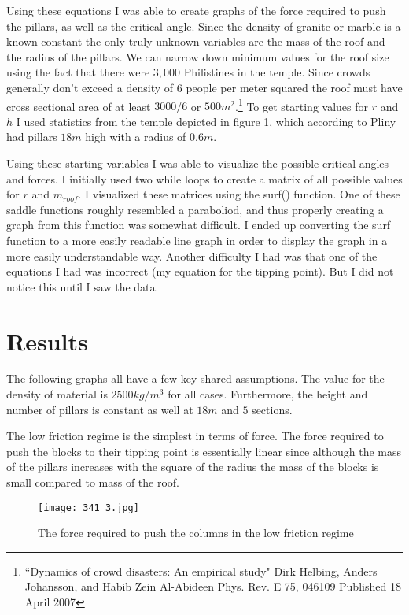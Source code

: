 \documentclass[two column]{article}
\begin{document}
Using these equations I was able to create graphs of the force required to push the pillars, as well as the critical angle. Since the density of granite or marble is a known constant the only truly unknown variables are the mass of the roof and the radius of the pillars. We can narrow down minimum values for the roof size using the fact that there were $3,000$ Philistines in the temple. Since crowds generally don't exceed a density of $6$ people per meter squared the roof must have cross sectional area of at least $3000/6$ or $500 m^2$.\footnote{``Dynamics of crowd disasters: An empirical study" Dirk Helbing, Anders Johansson, and Habib Zein Al-Abideen Phys. Rev. E 75, 046109 Published 18 April 2007} To get starting values for $r$ and $h$ I used statistics from the temple depicted in figure 1, which according to Pliny had pillars $18m$ high with a radius of $0.6m$.

Using these starting variables I was able to visualize the possible critical angles and forces. I initially used two while loops to create a matrix of all possible values for $r$ and $m_{roof}$. I visualized these matrices using the surf() function. One of these saddle functions roughly resembled a paraboliod, and thus properly creating a graph from this function was somewhat difficult. I ended up converting the surf function to a more easily readable line graph in order to display the graph in a more easily understandable way. Another difficulty I had was that one of the equations I had was incorrect (my equation for the tipping point). But I did not notice this until I saw the data.

\section{Results}
The following graphs all have a few key shared assumptions. The value for the density of material is $2500kg/m^3$ for all cases. Furthermore, the height and number of pillars is constant as well at $18m$ and $5$ sections.

The low friction regime is the simplest in terms of force. The force required to push the blocks to their tipping point is essentially linear since although the mass of the pillars increases with the square of the radius the mass of the blocks is small compared to mass of the roof. 

\begin{figure}[h]
\texttt{[image: 341\_3.jpg]}
\caption{The force required to push the columns in the low friction regime}
\end{figure}
\end{document}

